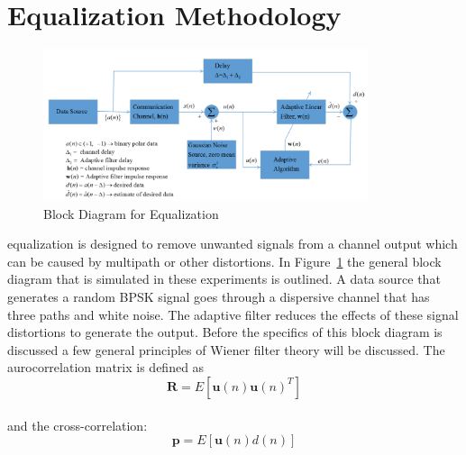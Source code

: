 \documentclass[journal]{IEEEtran}
\begin{document}


\section{Equalization Methodology}
\begin{figure}
  \centering
  \captionsetup{justification=centering,font = small}
  \includegraphics[width=0.85\textwidth] {Plots/BlockDiagram}
  \caption{Block Diagram for Equalization}
    \label{fig:BLOCK}
\end{figure}
 equalization is designed to remove unwanted signals from
a channel output which can be caused by multipath or other distortions. In Figure~\ref{fig:BLOCK} the
general block diagram that is simulated in these experiments is outlined. A data source that
generates a random BPSK signal goes through a dispersive channel that has three paths and white noise.
The adaptive filter reduces the effects of these signal distortions to generate the output.
Before the specifics of this block diagram is discussed a few general principles of
Wiener filter theory will be discussed. The aurocorrelation matrix is defined as
$$\boldsymbol{R} = E[\boldsymbol{u}(n)\boldsymbol{u}(n)^T] $$
\\
and the cross-correlation:
$$\boldsymbol{p} = E[\boldsymbol{u}(n)d(n)]$$
\end{document}
